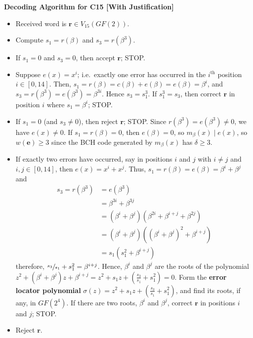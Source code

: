 \textbf{Decoding Algorithm for C15 [With Justification]}
\begin{itemize}
    \item Received word is $ \symbf{r}\in V_{15}(GF(2)) $.
    \item Compute $ s_1=r(\beta) $ and $ s_3=r(\beta^3) $.
    \item If $ s_1=0 $ and $ s_3=0 $, then accept $ \symbf{r} $; STOP\@.
    \item Suppose $ e(x)=x^i $; i.e.\ exactly one error has occurred in the $ i^{\text{th}} $
          position $ i\in[0,14] $. Then, $ s_1=r(\beta)=c(\beta)+e(\beta)=e(\beta)=\beta^i $,
          and $ s_3=r(\beta^3)=e(\beta^3)=\beta^{3i} $. Hence $ s_3=s_1^3 $.
          If $ s_1^3=s_3 $, then correct $ \symbf{r} $ in position $ i $ where $ s_1=\beta^i $;
          STOP\@.
    \item If $ s_1=0 $ (and $ s_3\neq 0 $), then reject $ \symbf{r} $; STOP\@.
          Since $ r(\beta^3)=e(\beta^3)\neq 0 $, we have $ e(x)\neq 0 $. If $ s_1=r(\beta)=0 $,
          then $ e(\beta)=0 $, so $ m_{\beta}(x)\mid e(x) $, so $ w(\symbf{e})\geqslant 3 $
          since the BCH code generated by $ m_{\beta}(x) $ has $ \delta\geqslant 3 $.
    \item If exactly two errors have occurred, say in positions $ i $ and $ j $ with
          $ i\neq j $ and $ i,j\in[0,14] $, then $ e(x)=x^i+x^j $. Thus, $ s_1=r(\beta)=
              e(\beta)=\beta^i+\beta^j $ and
          \begin{align*}
              s_3=r(\beta^3)
               & =e(\beta^3)                                           \\
               & =\beta^{3i}+\beta^{3j}                                \\
               & =(\beta^i+\beta^j)(\beta^{2i}+\beta^{i+j}+\beta^{2j}) \\
               & =(\beta^i+\beta^j)((\beta^i+\beta^j)^2+\beta^{i+j})   \\
               & =s_1(s_1^2+\beta^{i+j})
          \end{align*}
          therefore, $ \sfrac{s_3}{s_1}+s_1^2=\beta^{i+j} $. Hence, $ \beta^i $
          and $ \beta^j $ are the roots of the polynomial $ z^2+(\beta^i+\beta^j)z+\beta^{i+j}=
              z^2+s_1z+\left( \frac{s_3}{s_1} +s_1^2 \right)=0 $. Form the
          \textbf{error locator polynomial}
          $ \sigma(z)=z^2+s_1z+\left( \frac{s_3}{s_1} +s_1^2 \right) $, and find its
          roots, if any, in $ GF(2^4) $. If there are two roots, $ \beta^i $
          and $ \beta^j $, correct $ \symbf{r} $ in positions $ i $ and $ j $; STOP\@.
    \item Reject $ \symbf{r} $.
\end{itemize}

